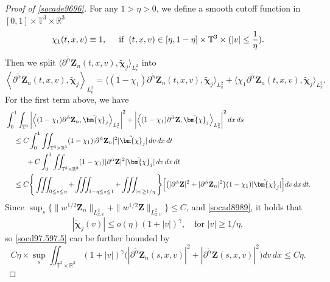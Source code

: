 \documentclass[reqno]{amsart}
\numberwithin{equation}{section}
\numberwithin{equation}{section}
\begin{document}
		\begin{proof}[Proof of \eqref{socade9696}]
		
		For any $ 1>\eta > 0 $, we define a smooth cutoff function 
		in $ [0, 1] \times \mathbb{T}^{3} \times \mathbb{R}^{3} $ 
		 $$ \chi_{1}(t, x,v) \equiv 1,\hspace{0.5cm}  \text{if} \hspace{0.2cm}(t, x,v)\in  [\eta, 1 - \eta] \times \mathbb{T}^{3} \times ( |v| \leq \frac{1}{\eta}). $$
		Then we split $\big\langle \partial^{\tilde{\alpha}} \mathbf{Z}_{n}(t, x, v), \tilde{\bm{\chi}}_j \big\rangle_{L^{2}_{v}}$ into
		\begin{equation}
		\left\langle \partial^{\tilde{\alpha}} \mathbf{Z}_{n}(t, x, v), \tilde{\bm{\chi}}_j \right\rangle_{L^{2}_{v}} = \big\langle (1 - \chi_{1})\partial^{\tilde{\alpha}} \mathbf{Z}_{n}(t, x, v), \tilde{\bm{\chi}}_j \big\rangle_{L^{2}_{v}} + \big\langle \chi_{1}\partial^{\tilde{\alpha}} \mathbf{Z}_{n}(t, x, v), \tilde{\bm{\chi}}_j \big\rangle_{L^{2}_{v}}. \label{socad9797}
		\end{equation}
		For the first term above, we have
		\begin{align}
			&\int_{0}^{1} \int_{\mathbb{T}^{3}} \left| \left\langle (1 - \chi_{1})\partial^{\tilde{\alpha}} \mathbf{Z}_{n}, \tilde{\bm{\chi}}_j \right\rangle_{L^{2}_{v}} \right|^{2} + \left| \left\langle (1 - \chi_{1})\partial^{\tilde{\alpha}} \mathbf{Z}, \tilde{\bm{\chi}}_j \right\rangle_{L^{2}_{v}} \right|^{2} dx\,ds \notag\\
			&\hspace{0.4cm}\leq C \int_{0}^{1} \iint_{\mathbb{T}^{3} \times \mathbb{R}^{3}} (1 - \chi_{1}) |\partial^{\tilde{\alpha}} \mathbf{Z}_{n}|^{2} |\tilde{\bm{\chi}}_j|\,dv\, dx\, dt \notag\\
			&\hspace{1cm}+ C \int_{0}^{1} \iint_{\mathbb{T}^{3} \times \mathbb{R}^{3}} (1 - \chi_{1}) |\partial^{\tilde{\alpha}} \mathbf{Z}|^{2} |\tilde{\bm{\chi}}_j|\,dv\, dx\, dt \notag\\
			&\hspace{0.4cm}\leq C \Bigg\{\iiint_{0 \le s \le \eta} +  \iiint_{1 - \eta \le s \le 1} +  \iiint_{|v| \geq 1/\eta}\Bigg\}\Big[\big(|\partial^{\tilde{\alpha}} \mathbf{Z}|^{2}+|\partial^{\tilde{\alpha}} \mathbf{Z}_{n}|^{2}\big)(1 - \chi_{1})|\tilde{\bm{\chi}}_j|\Big] dv \,dx\, dt.\label{socd97.597.5}
		\end{align}
		Since $\sup_{s} \big\{\| w^{1/2} \mathbf{Z}_{n} \|_{L^{2}_{x,v}} + \| w^{1/2} \mathbf{Z}\|_{L^{2}_{x,v}}\big\} \le C$, and \eqref{socad8989}, it holds that
		$$
		|\tilde{\bm{\chi}}_j(v)| \leq o(\eta)(1 + |v|)^{\gamma}, \quad \text{for } |v| \ge 1/\eta,
		$$
		so \eqref{socd97.597.5} can be further bounded by
		\begin{equation}
		C\eta \times \sup_{s} \iint_{\mathbb{T}^{3} \times \mathbb{R}^{3}} (1 + |v|)^{\gamma} \big(|\partial^{\tilde{\alpha}} \mathbf{Z}_{n}(s, x, v)|^{2} + |\partial^{\tilde{\alpha}} \mathbf{Z}(s, x, v)|^{2}\big) dv\, dx \leq C\eta. \label{socad9898}
		\end{equation}
		

\end{proof}
\end{document}
